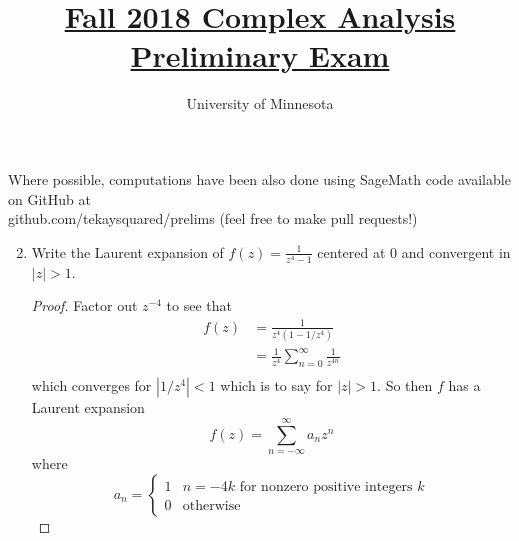 \documentclass{article}
\title{\href{https://math.umn.edu/sites/math.umn.edu/files/exams/complexf18.pdf}{Fall 2018 Complex Analysis Preliminary Exam}}
\author{University of Minnesota}
\date{}
\begin{document}
\maketitle

Where possible, computations have been also done using SageMath code available on GitHub at \\ github.com/tekaysquared/prelims (feel free to make pull requests!)

\begin{enumerate}


	\setcounter{enumi}{1}
	
	\item Write the Laurent expansion of $f(z) = \frac{1}{z^4-1}$ centered at $0$ and convergent in $|z|>1$.
	
	\begin{proof}
		Factor out $z^{-4}$ to see that 
		\begin{align*}
			f(z) &= \frac{1}{z^4 (1 - {1}/{z^4})}\\
			&= \frac{1}{z^4} \sum_{n=0}^\infty \frac{1}{z^{4n}} \\
		\end{align*}
		which converges for $|1/z^4| <1$ which is to say for $|z|>1$.
		So then $f$ has a Laurent expansion
		\[f(z) = \sum_{n = - \infty}^{\infty} a_n z^{n} \]
		where 
		\[ a_n = \begin{cases}
						  1 & n = -4k \text{ for nonzero positive integers }k\\
						  0 & \text{otherwise}
		\end{cases}\]
	\end{proof} 
	
\end{enumerate}
\end{document}
